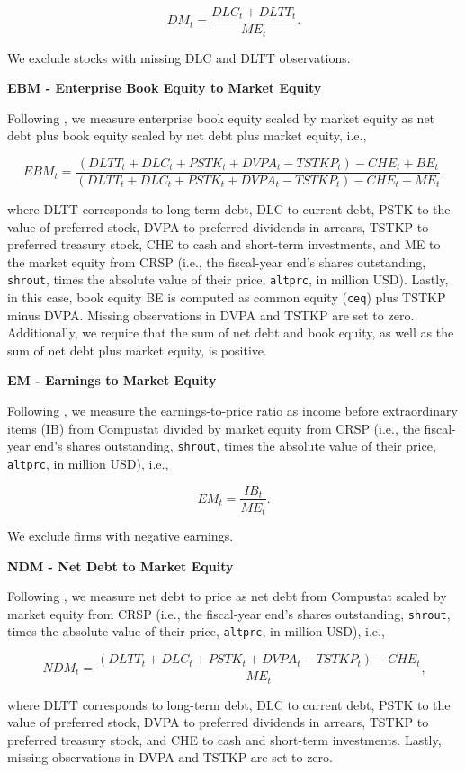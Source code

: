 \documentclass[
  article]{jss}
\begin{document}
\[
DM_{t} = \frac{DLC_{t} + DLTT_{t}}{ME_{t}}\text{.}
\]

We exclude stocks with missing DLC and DLTT observations.

\textbf{EBM - Enterprise Book Equity to Market Equity}

Following \citet{penman.2007}, we measure enterprise book equity scaled
by market equity as net debt plus book equity scaled by net debt plus
market equity, i.e.,

\[
EBM_{t} = \frac{(DLTT_{t} + DLC_{t} + PSTK_{t} + DVPA_{t} - TSTKP_{t}) - CHE_{t} + BE_{t}}{(DLTT_{t} + DLC_{t} + PSTK_{t} + DVPA_{t} - TSTKP_{t}) - CHE_{t} + ME_{t}}\text{,}
\]

where DLTT corresponds to long-term debt, DLC to current debt, PSTK to
the value of preferred stock, DVPA to preferred dividends in arrears,
TSTKP to preferred treasury stock, CHE to cash and short-term
investments, and ME to the market equity from CRSP (i.e., the
fiscal-year end's shares outstanding, \texttt{shrout}, times the
absolute value of their price, \texttt{altprc}, in million USD). Lastly,
in this case, book equity BE is computed as common equity (\texttt{ceq})
plus TSTKP minus DVPA. Missing observations in DVPA and TSTKP are set to
zero. Additionally, we require that the sum of net debt and book equity,
as well as the sum of net debt plus market equity, is positive.

\textbf{EM - Earnings to Market Equity}

Following \citet{basu.1983}, we measure the earnings-to-price ratio as
income before extraordinary items (IB) from Compustat divided by market
equity from CRSP (i.e., the fiscal-year end's shares outstanding,
\texttt{shrout}, times the absolute value of their price,
\texttt{altprc}, in million USD), i.e.,

\[
EM_{t} = \frac{IB_{t}}{ME_{t}}\text{.}
\]

We exclude firms with negative earnings.

\textbf{NDM - Net Debt to Market Equity}

Following \citet{penman.2007}, we measure net debt to price as net debt
from Compustat scaled by market equity from CRSP (i.e., the fiscal-year
end's shares outstanding, \texttt{shrout}, times the absolute value of
their price, \texttt{altprc}, in million USD), i.e.,

\[
NDM_{t} = \frac{(DLTT_{t} + DLC_{t} + PSTK_{t} + DVPA_{t} - TSTKP_{t}) - CHE_{t}}{ME_{t}}\text{,}
\]

where DLTT corresponds to long-term debt, DLC to current debt, PSTK to
the value of preferred stock, DVPA to preferred dividends in arrears,
TSTKP to preferred treasury stock, and CHE to cash and short-term
investments. Lastly, missing observations in DVPA and TSTKP are set to
zero.
\end{document}

